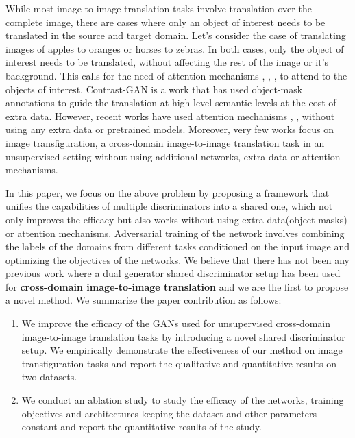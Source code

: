 \documentclass[a4paper,twoside]{article}
\begin{document}
While most image-to-image translation tasks involve translation over the complete image, there are cases where only an object of interest needs to be translated in the source and target domain. Let's consider the case of translating images of apples to oranges or horses to zebras. In both cases, only the object of interest needs to be translated, without affecting the rest of the image or it's background. This calls for the need of attention mechanisms \cite{KastaniotisATAGAN18}, \cite{qian2017AttentiveGAN}, \cite{zhang2018SAGAN}, \cite{talreja2019AGCoGAN} to attend to the objects of interest. Contrast-GAN \cite{ContrastGAN} is a work that has used object-mask annotations to guide the translation at high-level semantic levels at the cost of extra data. However, recent works have used attention mechanisms \cite{Residual-Attention_WangJQYLZWT17}, \cite{Mejjati2018UAIT}, \cite{attentionGAN} without using any extra data or pretrained models. Moreover, very few works focus on image transfiguration, a cross-domain image-to-image translation task in an unsupervised setting without using additional networks, extra data or attention mechanisms. 

In this paper, we focus on the above problem by proposing a framework that unifies the capabilities of multiple discriminators into a shared one, which not only improves the efficacy but also works without using extra data(object masks) or attention mechanisms. Adversarial training of the network involves combining the labels of the domains from different tasks conditioned on the input image and optimizing the objectives of the networks. We believe that there has not been any previous work where a dual generator shared discriminator setup has been used for \textbf{cross-domain image-to-image translation} and we are the first to propose a novel method. We summarize the paper contribution as follows:
\begin{enumerate}
\item 
We improve the efficacy of the GANs used for unsupervised cross-domain image-to-image translation tasks by introducing a novel shared discriminator setup. We empirically demonstrate the effectiveness of our method on image transfiguration tasks and report the qualitative and quantitative results on two datasets.
\item
We conduct an ablation study to study the efficacy of the networks, training objectives and architectures keeping the dataset and other parameters constant and report the quantitative results of the study.
\end{enumerate}
\end{document}
